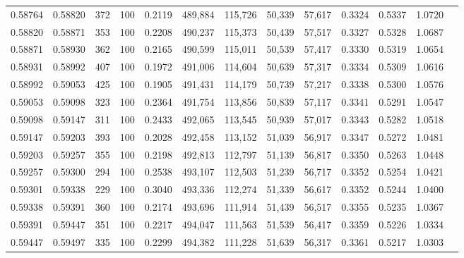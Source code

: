\begin{tabular}{rrrrrrrrrrrrr}
0.58764 & 0.58820 &   372 & 100 &                                     0.2119 & 489,884 & 115,726 &  50,339 &  57,617 & 0.3324 & 0.5337 & 1.0720 \\
0.58820 & 0.58871 &   353 & 100 &                                     0.2208 & 490,237 & 115,373 &  50,439 &  57,517 & 0.3327 & 0.5328 & 1.0687 \\
0.58871 & 0.58930 &   362 & 100 &                                     0.2165 & 490,599 & 115,011 &  50,539 &  57,417 & 0.3330 & 0.5319 & 1.0654 \\
0.58931 & 0.58992 &   407 & 100 &                                     0.1972 & 491,006 & 114,604 &  50,639 &  57,317 & 0.3334 & 0.5309 & 1.0616 \\
0.58992 & 0.59053 &   425 & 100 &                                     0.1905 & 491,431 & 114,179 &  50,739 &  57,217 & 0.3338 & 0.5300 & 1.0576 \\
0.59053 & 0.59098 &   323 & 100 &                                     0.2364 & 491,754 & 113,856 &  50,839 &  57,117 & 0.3341 & 0.5291 & 1.0547 \\
0.59098 & 0.59147 &   311 & 100 &                                     0.2433 & 492,065 & 113,545 &  50,939 &  57,017 & 0.3343 & 0.5282 & 1.0518 \\
0.59147 & 0.59203 &   393 & 100 &                                     0.2028 & 492,458 & 113,152 &  51,039 &  56,917 & 0.3347 & 0.5272 & 1.0481 \\
0.59203 & 0.59257 &   355 & 100 &                                     0.2198 & 492,813 & 112,797 &  51,139 &  56,817 & 0.3350 & 0.5263 & 1.0448 \\
0.59257 & 0.59300 &   294 & 100 &                                     0.2538 & 493,107 & 112,503 &  51,239 &  56,717 & 0.3352 & 0.5254 & 1.0421 \\
0.59301 & 0.59338 &   229 & 100 &                                     0.3040 & 493,336 & 112,274 &  51,339 &  56,617 & 0.3352 & 0.5244 & 1.0400 \\
0.59338 & 0.59391 &   360 & 100 &                                     0.2174 & 493,696 & 111,914 &  51,439 &  56,517 & 0.3355 & 0.5235 & 1.0367 \\
0.59391 & 0.59447 &   351 & 100 &                                     0.2217 & 494,047 & 111,563 &  51,539 &  56,417 & 0.3359 & 0.5226 & 1.0334 \\
0.59447 & 0.59497 &   335 & 100 &                                     0.2299 & 494,382 & 111,228 &  51,639 &  56,317 & 0.3361 & 0.5217 & 1.0303 \\

\end{tabular}
